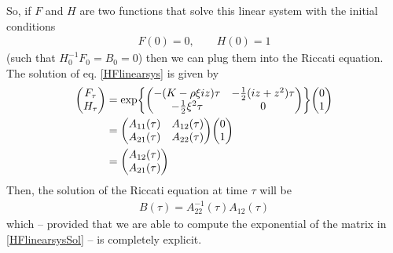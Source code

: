 So, if $F$ and $H$ are two functions that solve this linear system with the initial conditions
\begin{align}
    F(0) = 0, \qquad H(0) = 1
\end{align}
(such that $H_0^{-1}F_0=B_0=0$) then we can plug them into the Riccati equation. The solution of eq. \eqref{HFlinearsys} is given by
\begin{align}\label{HFlinearsysSol}
    \mqty(F_{\tau} \\ H_{\tau}) &= \exp{\mqty(-(K-\rho\xi iz)\tau & - \frac{1}{2}(iz+z^2)\tau \\ -\tfrac{1}{2}\xi^2\tau & 0)}\mqty(0\\1) \\
    &=
    \notag\mqty(A_{11}(\tau) & A_{12}(\tau) \\ A_{21}(\tau) & A_{22}(\tau))\mqty(0\\1) \\
    &=
    \notag\mqty(A_{12}(\tau) \\ A_{21}(\tau))
\end{align}
Then, the solution of the Riccati equation at time $\tau$ will be
\begin{eqnarray}
    B(\tau) = A_{22}^{-1}(\tau) A_{12}(\tau)
\end{eqnarray}
which -- provided that we are able to compute the exponential of the matrix in \eqref{HFlinearsysSol} -- is completely explicit. %

